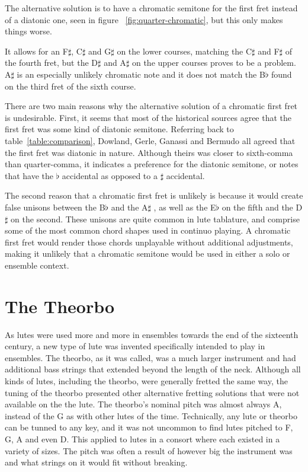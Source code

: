 The alternative solution is to have a chromatic semitone for the first fret instead of a
diatonic one, seen in figure ~\ref{fig:quarter-chromatic}, but this only makes things
worse.

It allows for an F$\sharp$, C$\sharp$ and G$\sharp$ on the lower courses, matching the
C$\sharp$ and F$\sharp$ of the fourth fret, but the D$\sharp$ and A$\sharp$ on the
upper courses proves to be a problem. A$\sharp$ is an especially unlikely chromatic
note and it does not match the B$\flat$ found on the third fret of the sixth course.

There are two main reasons why the alternative solution of a chromatic first fret is
undesirable. First, it seems that most of the historical sources agree that the first
fret was some kind of diatonic semitone.  Referring back to
table~\ref{table:comparison}, Dowland, Gerle, Ganassi and Bermudo all agreed that the
first fret was diatonic in nature. Although theirs was closer to sixth-comma than
quarter-comma, it indicates a preference for the diatonic semitone, or notes that have
the $\flat$ accidental as opposed to a $\sharp$ accidental.

The second reason that a chromatic first fret is unlikely is because it would create
false unisons between the B$\flat$ and the A$\sharp$ , as well as the E$\flat$ on the
fifth and the D$\sharp$ on the second. These unisons are quite common in lute
tablature, and comprise some of the most common chord shapes used in continuo playing.
A chromatic first fret would render those chords unplayable without additional
adjustments, making it unlikely that a chromatic semitone would be used in either a
solo or ensemble context.

\section{The Theorbo}

As lutes were used more and more in ensembles towards the end of the sixteenth century, a
new type of lute was invented specifically intended to play in ensembles.  The theorbo, as
it was called, was a much larger instrument and had additional bass strings that extended
beyond the length of the neck.  Although all kinds of lutes, including the theorbo, were
generally fretted the same way, the tuning of the theorbo presented other alternative
fretting solutions that were not available on the the lute.  The theorbo's nominal pitch
was almost always A, instead of the G as with other lutes of the time.  Technically, any
lute or theorbo can be tunned to any key, and it was not uncommon to find lutes pitched to
F, G, A and even D.  This applied to lutes in a consort where each existed in a variety of
sizes.  The pitch was often a result of however big the instrument was and what strings on
it would fit without breaking.


